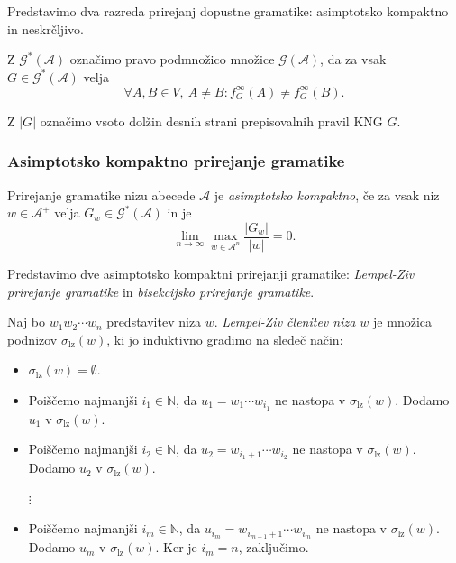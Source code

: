\documentclass[fin1, tisk]{fmfdelo}
\providecommand{\abs}[1]{\left\lvert #1 \right\rvert}
\newcommand{\N}{\mathbb{N}}
\newcommand{\A}{\mathcal{A}}
\newcommand{\G}{\mathcal{G}}
\theoremstyle{definition}
\begin{document}
Predstavimo dva razreda prirejanj dopustne gramatike: asimptotsko kompaktno in neskrčljivo.

\begin{definicija}
    Z $\G^*(\A)$ označimo pravo podmnožico množice $\G(\A)$, da za vsak $G \in \G^*(\A)$ velja
    \[
        \forall A,B \in V, \ A \neq B \colon f_G^\infty(A) \neq f_G^\infty(B).
    \]
\end{definicija}

\begin{definicija}
    Z $\abs{G}$ označimo vsoto dolžin desnih strani prepisovalnih pravil KNG $G$.
\end{definicija}

\subsubsection{Asimptotsko kompaktno prirejanje gramatike}

\begin{definicija}
    Prirejanje gramatike nizu abecede $\A$ je \textit{asimptotsko kompaktno}, če za vsak niz
    $w \in \A^+$ velja $G_w \in \G^*(\A)$ in je
    \[
        \lim_{n \rightarrow \infty} \max_{w \in \A^n} \frac{\abs{G_w}}{\abs{w}} = 0.
    \]
\end{definicija}

Predstavimo dve asimptotsko kompaktni prirejanji gramatike: \emph{Lempel-Ziv prirejanje gramatike}
in \emph{bisekcijsko prirejanje gramatike}.

\begin{definicija}
    Naj bo $ w_1w_2 \cdots w_n$ predstavitev niza $w$. 
    \emph{Lempel-Ziv členitev niza $w$} je množica podnizov $\sigma_\text{lz}(w)$,
    ki jo induktivno gradimo na sledeč način:
    \begin{itemize}
        \item $\sigma_\text{lz}(w) = \emptyset$.
        \item Poiščemo najmanjši $i_1 \in \N$, da $u_1 = w_1 \cdots w_{i_1}$ ne nastopa v 
        $\sigma_{\text{lz}}(w)$. Dodamo $u_1$ v $\sigma_{\text{lz}}(w)$.
        \item Poiščemo najmanjši $i_2 \in \N$, da $u_2 = w_{i_1+1} \cdots w_{i_2}$ ne nastopa v 
        $\sigma_{\text{lz}}(w)$. Dodamo $u_2$ v $\sigma_{\text{lz}}(w)$. \\
        \begin{center}
        $\vdots$
        \end{center}
        \item Poiščemo najmanjši $i_{m} \in \N$, da $u_{i_m} = w_{i_{m-1}+1} \cdots w_{i_m}$
        ne nastopa v $\sigma_{\text{lz}}(w)$. Dodamo $u_m$ v $\sigma_{\text{lz}}(w)$.
        Ker je $i_m = n$, zaključimo.
    \end{itemize}
\end{definicija}
\end{document}

